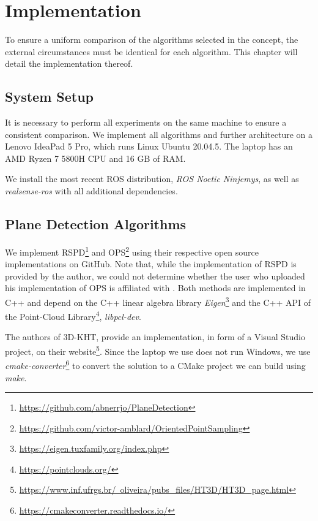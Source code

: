 \documentclass[main.tex]{subfiles}
\begin{document}
\chapter{Implementation}
To ensure a uniform comparison of the algorithms selected in the concept, the external circumstances
must be identical for each algorithm. This chapter will detail the implementation thereof.

\section{System Setup}
It is necessary to perform all experiments on the same machine to ensure a consistent comparison.
We implement all algorithms and further architecture on a Lenovo IdeaPad 5 Pro,
which runs Linux Ubuntu 20.04.5. The laptop has an AMD Ryzen 7 5800H CPU and 16 GB of RAM.

We install the most recent ROS distribution, \textit{ROS Noetic Ninjemys}, as well as \textit{realsense-ros} with all additional dependencies.


\section{Plane Detection Algorithms}
We implement RSPD\footnote{\href{https://github.com/abnerrjo/PlaneDetection}{https://github.com/abnerrjo/PlaneDetection}} and OPS\footnote{\href{https://github.com/victor-amblard/OrientedPointSampling}{https://github.com/victor-amblard/OrientedPointSampling}} using their respective open source implementations on GitHub. 
Note that, while the implementation of RSPD is provided by the author, we could not determine whether the user who uploaded his implementation of OPS is affiliated with \citeauthor{Sun_Mordohai_2019}.
Both methods are implemented in C++ and depend on the C++ linear algebra library \textit{Eigen}\footnote{\href{https://eigen.tuxfamily.org/index.php}{https://eigen.tuxfamily.org/index.php}}
and the C++ API of the  Point-Cloud Library\footnote{\href{https://pointclouds.org/}{https://pointclouds.org/}}, \textit{libpcl-dev}.

The authors of 3D-KHT, provide an implementation, in form of a Visual Studio project, on their website\footnote{\href{https://www.inf.ufrgs.br/~oliveira/pubs_files/HT3D/HT3D_page.html}
    {https://www.inf.ufrgs.br/~oliveira/pubs\_files/HT3D/HT3D\_page.html}}. Since the laptop we use does not run Windows, we use \textit{cmake-converter}\footnote{\href{https://cmakeconverter.readthedocs.io/en/latest/use.html}{https://cmakeconverter.readthedocs.io/}} to convert
the solution to a CMake project we can build using \textit{make}.
\end{document}
